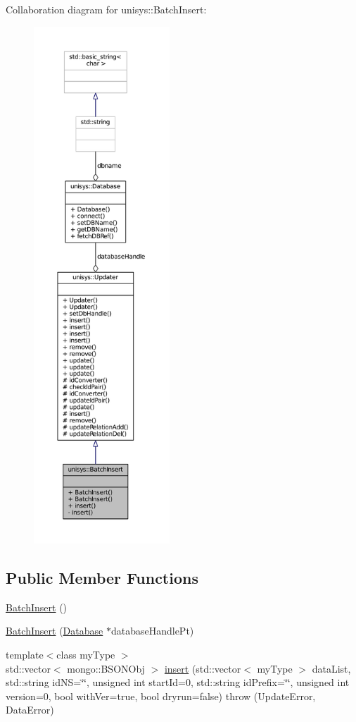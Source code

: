 Collaboration diagram for unisys\-:\-:Batch\-Insert\-:
\nopagebreak
\begin{figure}[H]
\begin{center}
\leavevmode
\includegraphics[height=550pt]{classunisys_1_1BatchInsert__coll__graph}
\end{center}
\end{figure}
\subsection*{Public Member Functions}
\begin{DoxyCompactItemize}
\item 
\hyperlink{classunisys_1_1BatchInsert_a6ae2cc7e268f83cf1ecc99058b62011d}{Batch\-Insert} ()
\item 
\hyperlink{classunisys_1_1BatchInsert_a751ec752b94fd29565e5e515a3f83d50}{Batch\-Insert} (\hyperlink{classunisys_1_1Database}{Database} $\ast$database\-Handle\-Pt)
\item 
{\footnotesize template$<$class my\-Type $>$ }\\std\-::vector$<$ mongo\-::\-B\-S\-O\-N\-Obj $>$ \hyperlink{classunisys_1_1BatchInsert_a3fa151c77cd33efbbd97311aa51acbcd}{insert} (std\-::vector$<$ my\-Type $>$ data\-List, std\-::string id\-N\-S=\char`\"{}\char`\"{}, unsigned int start\-Id=0, std\-::string id\-Prefix=\char`\"{}\char`\"{}, unsigned int version=0, bool with\-Ver=true, bool dryrun=false)  throw (\-Update\-Error, Data\-Error)
\end{DoxyCompactItemize}

